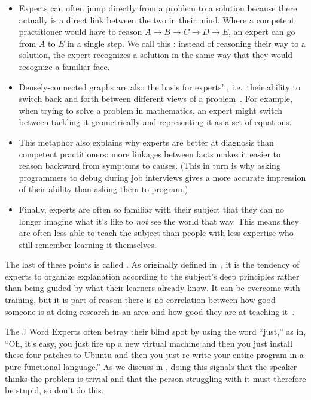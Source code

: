 \begin{itemize}

\item
  Experts can often jump directly from a problem to a solution
  because there actually is a direct link between the two in their mind.
  Where a competent practitioner would have to reason
  $A{\rightarrow}B{\rightarrow}C{\rightarrow}D{\rightarrow}E$,
  an expert can go from $A$ to $E$ in a single step.
  We call this :
  instead of reasoning their way to a solution,
  the expert recognizes a solution in the same way that they would recognize a familiar face.

\item
  Densely-connected graphs are also the basis for experts'
  ,
  i.e.\ their ability to switch back and forth between different views of a problem~\cite{Petr2016}.
  For example,
  when trying to solve a problem in mathematics,
  an expert might switch between tackling it geometrically
  and representing it as a set of equations.

\item
  This metaphor also explains why experts are better at diagnosis than competent practitioners:
  more linkages between facts makes it easier to reason backward from symptoms to causes.
  (This in turn is why asking programmers to debug during job interviews
  gives a more accurate impression of their ability than asking them to program.)

\item
  Finally,
  experts are often so familiar with their subject that
  they can no longer imagine what it's like to \emph{not} see the world that way.
  This means they are often less able to teach the subject than people with less expertise
  who still remember learning it themselves.

\end{itemize}

The last of these points is called .
As originally defined in~\cite{Nath2003},
it is the tendency of experts to organize explanation according to the subject's deep principles
rather than being guided by what their learners already know.
It can be overcome with training,
but it is part of reason there is no correlation between
how good someone is at doing research in an area
and how good they are at teaching it~\cite{Mars2002}.

\begin{aside}{The J Word}
  Experts often betray their blind spot by using the word ``just,''
  as in,
  ``Oh, it's easy, you just fire up a new virtual machine
  and then you just install these four patches to Ubuntu
  and then you just re-write your entire program in a pure functional language.''
  As we discuss in ,
  doing this signals that the speaker thinks the problem is trivial
  and that the person struggling with it must therefore be stupid,
  so don't do this.
\end{aside}

